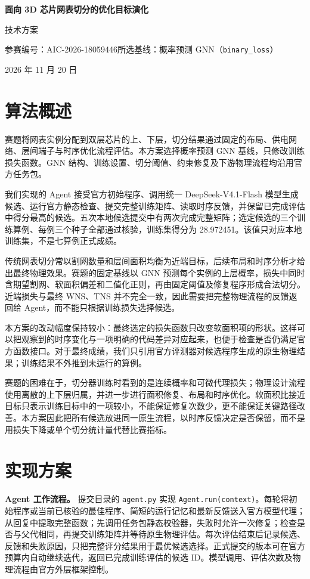 \documentclass[UTF8,a4paper,11pt]{ctexart}
\begin{document}
\begin{center}
{\LARGE\bfseries 面向 3D 芯片网表切分的优化目标演化}\par
\vspace{0.35em}
{\Large 技术方案}\par
\vspace{0.6em}
参赛编号：AIC-2026-18059446\quad 所选基线：概率预测 GNN（\texttt{binary\_loss}）\par
2026 年 11 月 20 日
\end{center}

\section{算法概述}
赛题将网表实例分配到双层芯片的上、下层，切分结果通过固定的布局、供电网络、层间端子与时序优化流程评估。本方案选择概率预测 GNN 基线，只修改训练损失函数。GNN 结构、训练设置、切分阈值、约束修复及下游物理流程均沿用官方任务包。

我们实现的 Agent 接受官方初始程序、调用统一 DeepSeek-V4.1-Flash 模型生成候选、运行官方静态检查、提交完整训练矩阵、读取时序反馈，并保留已完成评估中得分最高的候选。五次本地候选提交中有两次完成完整矩阵；选定候选的三个训练算例、每例三个种子全部通过核验，训练集得分为 28.972451。该值只对应本地训练集，不是七算例正式成绩。


传统网表切分常以割网数量和层间面积均衡为近端目标，后续布局和时序分析才给出最终物理效果。赛题的固定基线以 GNN 预测每个实例的上层概率，损失中同时含期望割网、软面积偏差和二值化正则，再由固定阈值及修复程序形成合法切分。近端损失与最终 WNS、TNS 并不完全一致，因此需要把完整物理流程的反馈返回给 Agent，而不能只根据训练损失选择候选。

本方案的改动幅度保持较小：最终选定的损失函数只改变软面积项的形状。这样可以把观察到的时序变化与一项明确的代码差异对应起来，也便于检查是否仍满足官方函数接口。对于最终成绩，我们只引用官方评测器对候选程序生成的原生物理结果；训练结果不外推到未运行的算例。

赛题的困难在于，切分器训练时看到的是连续概率和可微代理损失；物理设计流程使用离散的上下层归属，并进一步进行面积修复、布局和时序优化。软面积比接近目标只表示训练目标中的一项较小，不能保证修复次数少，更不能保证关键路径改善。本方案因此把所有候选放进同一原生流程，以时序反馈决定是否保留，而不是用损失下降或单个切分统计量代替比赛指标。
\section{实现方案}
\textbf{Agent 工作流程。} 提交目录的 \texttt{agent.py} 实现 \texttt{Agent.run(context)}。每轮将初始程序或当前已核验的最佳程序、简短的运行记忆和最新反馈送入官方模型代理；从回复中提取完整函数；先调用任务包静态校验器，失败时允许一次修复；检查是否与父代相同，再提交训练矩阵并等待原生物理评估。每次评估结束后记录候选、反馈和失败原因，只把完整评分结果用于最优候选选择。正式提交的版本可在官方预算内自动继续迭代，返回已完成训练评估的候选 ID。模型调用、评估次数及物理流程由官方外层框架控制。
\end{document}
